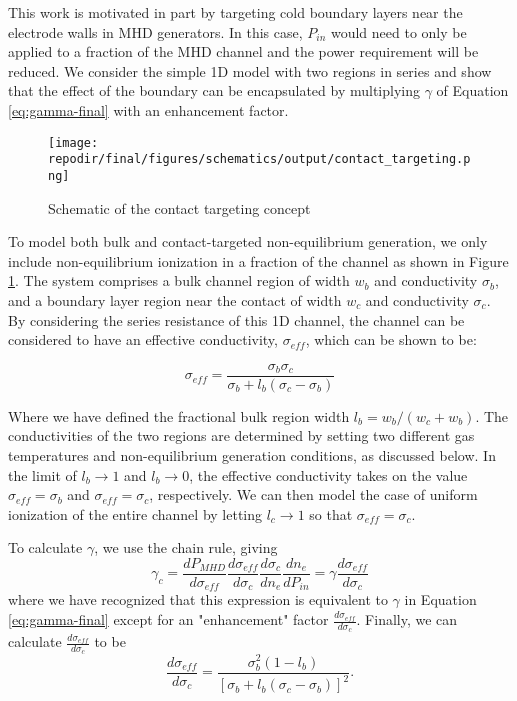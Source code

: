 This work is motivated in part by targeting cold boundary layers near the electrode walls in MHD generators. In this case, $P_{in}$ would need to only be applied to a fraction of the MHD channel and the power requirement will be reduced. We consider the simple 1D model with two regions in series and show that the effect of the boundary can be encapsulated by multiplying $\gamma$ of Equation \ref{eq:gamma-final} with an enhancement factor.

\begin{figure}[h]
    \centering
    \texttt{[image: \\repodir/final/figures/schematics/output/contact\_targeting.png]} 
    \caption{Schematic of the contact targeting concept}
    \label{fig:SI_contact_targeting_schematic}
\end{figure}


To model both bulk and contact-targeted non-equilibrium generation, we only include non-equilibrium ionization in a fraction of the channel as shown in Figure \ref{fig:SI_contact_targeting_schematic}. The system comprises a bulk channel region of width $w_{b}$ and conductivity $\sigma_{b}$, and a boundary layer region near the contact of width $w_{c}$ and conductivity $\sigma_{c}$. By considering the series resistance of this 1D channel, the channel can be considered to have an effective conductivity, $\sigma_{eff}$, which can be shown to be:  

\begin{equation}
\sigma_{eff}=\frac{\sigma_{b} \sigma_{c}}{\sigma_{b}+l_{b}  (\sigma_{c}  -\sigma_{b})}
\end{equation}

Where we have defined the fractional bulk region width $l_{b}=w_{b}/(w_{c}+w_{b})$. The conductivities of the two regions are determined by setting two different gas temperatures and non-equilibrium generation conditions, as discussed below. In the limit of $l_{b}\rightarrow1$ and $l_{b}\rightarrow0$, the effective conductivity takes on the value $\sigma_{eff}= \sigma_{b}$ and $\sigma_{eff}= \sigma_{c}$, respectively. We can then model the case of uniform ionization of the entire channel by letting $l_{c}\rightarrow1$ so that $\sigma_{eff}= \sigma_{c}$.

To calculate $\gamma$, we use the chain rule, giving
\begin{equation}
\gamma_{c}=\frac{dP_{MHD}}{d\sigma_{eff}} \frac{d\sigma_{eff}}{d\sigma_{c}} \frac{d\sigma_{c}}{dn_e} \frac{dn_e}{dP_{in}}=\gamma \frac{d\sigma_{eff}}{d\sigma_{c}} 
\end{equation}
where we have recognized that this expression is equivalent to $\gamma$ in Equation \ref{eq:gamma-final} except for an "enhancement" factor $\frac{d\sigma_{eff}}{d\sigma_{c}}$. Finally, we can calculate $\frac{d\sigma_{eff}}{d\sigma_{c}}$ to be
\begin{equation}
\frac{d\sigma_{eff}}{d\sigma_{c}}=\frac{\sigma_{b}^2 (1-l_{b})}{[\sigma_{b}+l_{b} (\sigma_{c}-\sigma_{b})]^2} .
\end{equation}

